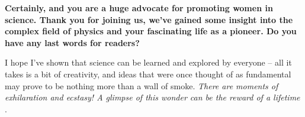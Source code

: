 \documentclass{article}
\newcommand{\q}[1]{\vspace{10pt}
\textbf{#1}}
\begin{document}
\begin{multicols}{2}
\q{Certainly, and you are a huge advocate for promoting women in science. Thank you for joining us, we’ve gained some insight into the complex field of physics and your fascinating life as a pioneer. Do you have any last words for readers?}

I hope I've shown that science can be learned and explored by everyone – all it takes is a bit of creativity, and ideas that were once thought of as fundamental may prove to be nothing more than a wall of smoke. \textit{There are moments of exhilaration and ecstasy! A glimpse of this wonder can be the reward of a lifetime} \cite{N10}.

\closearticle



\end{multicols}

\newpage


\end{document}

